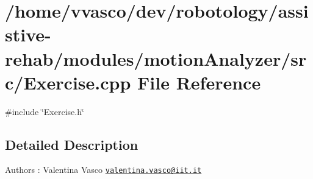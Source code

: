 \section{/home/vvasco/dev/robotology/assistive-\/rehab/modules/motion\+Analyzer/src/\+Exercise.cpp File Reference}
\label{Exercise_8cpp}
{\ttfamily \#include \char`\"{}Exercise.\+h\char`\"{}}\newline


\subsection{Detailed Description}
\begin{DoxyAuthor}{Authors}
\+: Valentina Vasco \href{mailto:valentina.vasco@iit.it}{\tt valentina.\+vasco@iit.\+it} 
\end{DoxyAuthor}

